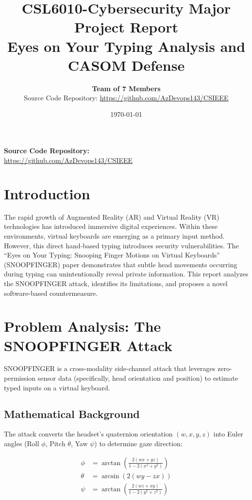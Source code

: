 \documentclass[12pt,a4paper]{article}
\title{\textbf{CSL6010-Cybersecurity Major Project Report}\\
\Large Eyes on Your Typing Analysis and CASOM Defense}
\author{\textbf{Team of 7 Members}\\
\small Source Code Repository: \url{https://github.com/AzDevops143/CSIEEE}}
\date{\today}
\begin{document}
\maketitle
\thispagestyle{fancy} %

\begin{center}
\textbf{Source Code Repository:}\\
\url{https://github.com/AzDevops143/CSIEEE}
\end{center}

\tableofcontents
\newpage

\section{Introduction}
The rapid growth of Augmented Reality (AR) and Virtual Reality (VR) technologies has introduced immersive digital experiences. Within these environments, virtual keyboards are emerging as a primary input method. However, this direct hand-based typing introduces security vulnerabilities. The ``Eyes on Your Typing: Snooping Finger Motions on Virtual Keyboards'' (SNOOPFINGER) paper demonstrates that subtle head movements occurring during typing can unintentionally reveal private information. This report analyzes the SNOOPFINGER attack, identifies its limitations, and proposes a novel software-based countermeasure.

\section{Problem Analysis: The SNOOPFINGER Attack}
SNOOPFINGER is a cross-modality side-channel attack that leverages zero-permission sensor data (specifically, head orientation and position) to estimate typed inputs on a virtual keyboard. 

\subsection{Mathematical Background}
The attack converts the headset's quaternion orientation $(w, x, y, z)$ into Euler angles (Roll $\phi$, Pitch $\theta$, Yaw $\psi$) to determine gaze direction:

\begin{align}
\phi &= \arctan\left(\frac{2(wx+yz)}{1-2(x^2+y^2)}\right) \\
\theta &= \arcsin(2(wy - zx)) \\
\psi &= \arctan\left(\frac{2(wz+xy)}{1-2(y^2+z^2)}\right)
\end{align}
\end{document}
